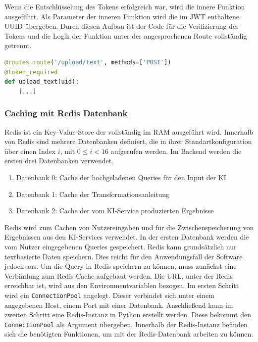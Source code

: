 Wenn die Entschlüsselung des Tokens erfolgreich war, wird die innere Funktion ausgeführt. Als Parameter der inneren Funktion wird die im JWT enthaltene UUID übergeben. Durch diesen Aufbau ist der Code für die Verifizierung des Tokens und die Logik der Funktion unter der angesprochenen Route vollständig getrennt.

\begin{lstlisting}[language=Python, caption={Route zum Upload von Queries mit Nutzung des JWTs}]
@routes.route('/upload/text', methods=['POST'])
@token_required
def upload_text(uid):
    [...]
\end{lstlisting}

\subsubsection{Caching mit Redis Datenbank}
Redis ist ein Key-Value-Store der vollständig im RAM ausgeführt wird. Innerhalb von Redis sind mehrere Datenbanken definiert, die in ihrer Standartkonfiguration über einen Index $i$, mit $0\leq{}i<16$ aufgerufen werden. Im Backend werden die ersten drei Datenbanken verwendet.
\begin{enumerate}
 \item Datenbank 0: Cache der hochgeladenen Queries für den Input der KI
 \item Datenbank 1: Cache der Transformationsanleitung
 \item Datenbank 2: Cache der vom KI-Service produzierten Ergebnisse
\end{enumerate} 

Redis wird zum Cachen von Nutzereingaben und für die Zwischenspeicherung von Ergebnissen aus den KI-Services verwendet. In der ersten Datenbank werden die vom Nutzer eingegebenen Queries gespeichert. Redis kann grundsätzlich nur textbasierte Daten speichern. Dies reicht für den Anwendungsfall der Software jedoch aus. Um die Query in Redis speichern zu können, muss zunächst eine Verbindung zum Redis Cache aufgebaut werden. Die URL, unter der Redis erreichbar ist, wird aus den Environmentvariablen bezogen. Im ersten Schritt wird ein \texttt{ConnectionPool} angelegt. Dieser verbindet sich unter einem angegebenen Host, einem Port mit einer Datenbank. Anschließend kann im zweiten Schritt eine Redis-Instanz in Python erstellt werden. Diese bekommt den \texttt{ConnectionPool} als Argument übergeben. Innerhalb der Redis-Instanz befinden sich die benötigten Funktionen, um mit der Redis-Datenbank arbeiten zu können.

